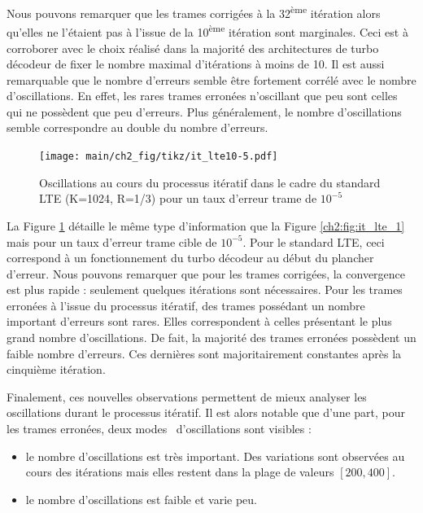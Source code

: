 Nous pouvons remarquer que les trames corrigées à la 32\textsuperscript{ème} itération alors qu'elles ne l'étaient pas à 
l'issue de la 10\textsuperscript{ème} itération sont marginales. Ceci est à corroborer avec le choix réalisé dans la majorité des 
architectures de turbo décodeur de fixer le nombre maximal d'itérations à moins de 10.
Il est aussi remarquable que le nombre d'erreurs semble être fortement corrélé avec le nombre d'oscillations. En effet, 
les rares trames erronées n'oscillant que peu sont celles qui ne possèdent que peu d'erreurs. Plus généralement,
le nombre d'oscillations semble correspondre au double du nombre d'erreurs.

\begin{figure}[!h]
	\hspace*{-.7cm}
	\begin{center}
	\texttt{[image: main/ch2\_fig/tikz/it\_lte10-5.pdf]}
	\caption{Oscillations au cours du processus itératif dans le cadre du standard LTE (K=1024, R=1/3) pour un taux d'erreur trame de $10^{-5}$ 
	\label{ch2:fig:it_lte_2}}
	\end{center}
\end{figure}

La Figure \ref{ch2:fig:it_lte_2} détaille le même type d'information que la Figure \ref{ch2:fig:it_lte_1} mais pour un 
taux d'erreur trame cible de $10^{-5}$. Pour le standard LTE, ceci correspond à un fonctionnement du 
turbo décodeur au début du plancher d'erreur. Nous pouvons remarquer que pour les trames corrigées, la convergence est 
plus rapide : seulement quelques itérations sont nécessaires. Pour les trames erronées à l'issue 
du processus itératif, des trames possédant un nombre important d'erreurs sont rares. Elles correspondent à celles 
présentant le plus grand nombre d'oscillations. De fait, la majorité des trames erronées possèdent un faible nombre 
d'erreurs. Ces dernières sont majoritairement constantes après la cinquième itération.

Finalement, ces nouvelles observations permettent de mieux analyser les oscillations durant le processus itératif. Il est alors 
notable que d'une part, pour les trames erronées, deux \og modes \fg ~d'oscillations sont visibles :
\begin{itemize}
	\item le nombre d'oscillations est très important. Des variations sont observées au cours des itérations mais elles 
	restent dans la plage de valeurs $[200,400]$.
	\item le nombre d'oscillations est faible et varie peu.
\end{itemize}

